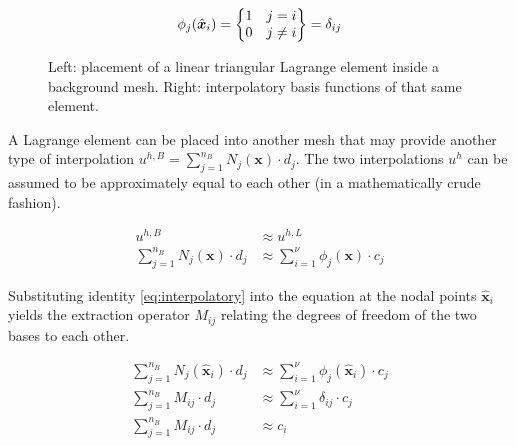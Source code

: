 \begin{equation}
\label{eq:interpolatory}
    \phi_j(\hat{\bm{x}}_i) =
    \left\{
    \begin{array}{@{}c@{}}
        1 ~~~ j=i \\
        0 ~~~ j \neq i
    \end{array} 
    \right\} 
    = \delta_{ij}
\end{equation}
    
\begin{figure}[h]
    \vspace{0.2cm}
    \begin{center}
    
    \caption{Left: placement of a linear triangular Lagrange element inside a background mesh. Right: interpolatory basis functions of that same element.} 
    \label{fig:lagrange_extraction}
    \end{center}
\end{figure}

A Lagrange element can be placed into another mesh that may provide another type of interpolation $u^{h,B} = \sum_{j=1}^{n_B} N_j(\bm{x}) \cdot d_j$. The two interpolations $u^{h}$ can be assumed to be approximately equal to each other (in a mathematically crude fashion).

\begin{equation}
\label{eq:approx}
\begin{split}
    u^{h,B} 
    &\approx u^{h,L} \\
    \sum_{j=1}^{n_B} N_j(\bm{x}) \cdot d_j 
    &\approx \sum_{i=1}^{\nu} \phi_j(\bm{x}) \cdot c_j
\end{split}
\end{equation}

Substituting identity \eqref{eq:interpolatory} into the equation at the nodal points $\hat{\bm{x}}_i$ yields the extraction operator $M_{ij}$ relating the degrees of freedom of the two bases to each other.

\begin{equation}
    \label{eq:derive_extraction_operator}
    \begin{split}
        \sum_{j=1}^{n_B} N_j(\hat{\bm{x}}_i) \cdot d_j 
        &\approx \sum_{i=1}^{\nu} \phi_j(\hat{\bm{x}}_i) \cdot c_j \\
        \sum_{j=1}^{n_B} M_{ij} \cdot d_j 
        &\approx \sum_{i=1}^{\nu} \delta_{ij} \cdot c_j \\
        \sum_{j=1}^{n_B} M_{ij} \cdot d_j 
        &\approx c_i \\
    \end{split}
\end{equation}

